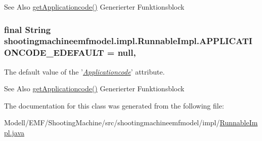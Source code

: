 \begin{DoxySeeAlso}{See Also}
\hyperlink{classshootingmachineemfmodel_1_1impl_1_1_runnable_impl_a0c4ca1026ad6477d734cdb3ddcaee3c0}{get\-Applicationcode()} Generierter Funktionsblock  
\end{DoxySeeAlso}
\hypertarget{classshootingmachineemfmodel_1_1impl_1_1_runnable_impl_a5cc1f2a8695f4d19623ada5c1eee8e42}{
\subsubsection[{A\-P\-P\-L\-I\-C\-A\-T\-I\-O\-N\-C\-O\-D\-E\-\_\-\-E\-D\-E\-F\-A\-U\-L\-T}]{\setlength{\rightskip}{0pt plus 5cm}final String shootingmachineemfmodel.\-impl.\-Runnable\-Impl.\-A\-P\-P\-L\-I\-C\-A\-T\-I\-O\-N\-C\-O\-D\-E\-\_\-\-E\-D\-E\-F\-A\-U\-L\-T = null\hspace{0.3cm}{\ttfamily [static]}, {\ttfamily [protected]}}}\label{classshootingmachineemfmodel_1_1impl_1_1_runnable_impl_a5cc1f2a8695f4d19623ada5c1eee8e42}
The default value of the '\hyperlink{classshootingmachineemfmodel_1_1impl_1_1_runnable_impl_a0c4ca1026ad6477d734cdb3ddcaee3c0}{{\itshape Applicationcode}}' attribute.

\begin{DoxySeeAlso}{See Also}
\hyperlink{classshootingmachineemfmodel_1_1impl_1_1_runnable_impl_a0c4ca1026ad6477d734cdb3ddcaee3c0}{get\-Applicationcode()} Generierter Funktionsblock  
\end{DoxySeeAlso}


The documentation for this class was generated from the following file\-:\begin{DoxyCompactItemize}
\item 
Modell/\-E\-M\-F/\-Shooting\-Machine/src/shootingmachineemfmodel/impl/\hyperlink{_runnable_impl_8java}{Runnable\-Impl.\-java}\end{DoxyCompactItemize}
